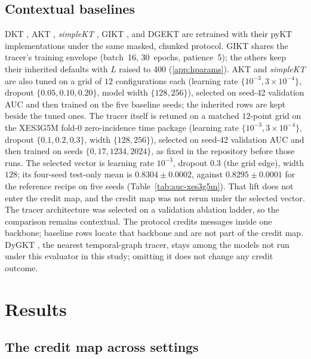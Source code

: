 \documentclass[review,12pt]{elsarticle}
\begin{document}
\subsection{Contextual baselines}
\label{sec:baselines-reuse}
DKT \cite{piech2015dkt}, AKT \cite{ghosh2020akt}, \textit{simpleKT}
\cite{liu2023simplekt}, GIKT \cite{yang2021gikt}, and DGEKT
\cite{dgekt2024} are retrained with their pyKT implementations
under the same masked, chunked protocol. GIKT shares the tracer's
training envelope (batch~16, 30~epochs, patience~5); the others keep
their inherited defaults with $L$ raised to 400 (\ref{app:hparams}).
AKT and \textit{simpleKT} are also tuned on a grid of $12$
configurations each (learning rate $\{10^{-3},3{\times}10^{-4}\}$,
dropout $\{0.05,0.10,0.20\}$, model width $\{128,256\}$), selected on
seed-42 validation AUC and then trained on the five baseline seeds; the
inherited rows are kept beside the tuned ones. The tracer itself is
retuned on a matched $12$-point grid on the XES3G5M fold-0
zero-incidence time package (learning rate
$\{10^{-3},3{\times}10^{-4}\}$, dropout $\{0.1,0.2,0.3\}$, width
$\{128,256\}$), selected on seed-42 validation AUC and then trained on
seeds $\{0,17,1234,2024\}$, as fixed in the repository before those
runs. The selected vector is learning rate $10^{-3}$, dropout $0.3$
(the grid edge), width $128$; its four-seed test-only mean is
$0.8304{\pm}0.0002$, against $0.8295{\pm}0.0001$ for the reference
recipe on five seeds (Table~\ref{tab:auc-xes3g5m}). That lift does not
enter the credit map, and the credit map was not rerun under the
selected vector.
The tracer architecture was selected on a validation ablation ladder,
so the comparison remains contextual. The protocol credits messages
inside one backbone; baseline rows locate that backbone and are not
part of the credit map. DyGKT \cite{dygkt2024}, the nearest
temporal-graph tracer, stays among the models not run under this
evaluator in this study; omitting it does not change any credit outcome.

\section{Results}
\label{sec:eval}
\label{sec:results}

\subsection{The credit map across settings}
\label{sec:transfer-ladder}
\end{document}
